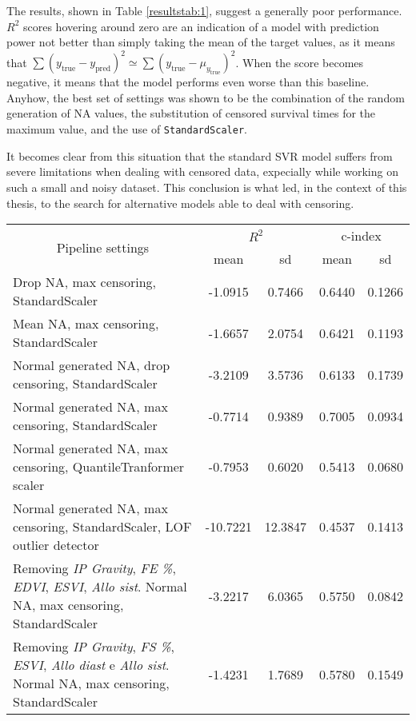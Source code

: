\documentclass[12pt]{report}
\begin{document}
The results, shown in Table \ref{resultstab:1}, suggest a generally poor performance. $R^2$ scores hovering around zero are an indication of a model with prediction power not better than simply taking the mean of the target values, as it means that $\sum(y_{\text{true}} - y_{\text{pred}})^2 \simeq \sum(y_{\text{true}} - \mu_{y_{\text{true}}})^2$. When the score becomes negative, it means that the model performs even worse than this baseline. Anyhow, the best set of settings was shown to be the combination of the random generation of NA values, the substitution of censored survival times for the maximum value, and the use of \texttt{StandardScaler}.

It becomes clear from this situation that the standard SVR model suffers from severe limitations when dealing with censored data, expecially while working on such a small and noisy dataset. This conclusion is what led, in the context of this thesis, to the search for alternative models able to deal with censoring.

\begin{center}
 \begin{tabular}{ |m{7cm}|c|c|c|c| }
\hline
\multicolumn{1}{|c|}{\multirow{2}{*}{Pipeline settings}} & \multicolumn{2}{|c|}{$R^2$} & \multicolumn{2}{|c|}{c-index} \\ \cline{2-5}
& mean & sd & mean & sd \\ \hline
Drop NA, max censoring, StandardScaler & -1.0915 & 0.7466 & 0.6440 & 0.1266 \\ \hline
Mean NA, max censoring, StandardScaler & -1.6657 & 2.0754 & 0.6421 & 0.1193 \\ \hline
Normal generated NA, drop censoring, StandardScaler & -3.2109 & 3.5736 & 0.6133 & 0.1739 \\ \hline
Normal generated NA, max censoring, StandardScaler & -0.7714 & 0.9389 & 0.7005 & 0.0934 \\ \hline
Normal generated NA, max censoring, QuantileTranformer scaler & -0.7953 & 0.6020 & 0.5413 & 0.0680 \\ \hline
Normal generated NA, max censoring, StandardScaler, LOF outlier detector & -10.7221 & 12.3847 & 0.4537 & 0.1413 \\ \hline
Removing \textit{IP Gravity}, \textit{FE \%}, \textit{EDVI}, \textit{ESVI}, \textit{Allo sist}. Normal NA, max censoring, StandardScaler & -3.2217 & 6.0365 & 0.5750 & 0.0842 \\ \hline
Removing \textit{IP Gravity}, \textit{FS \%}, \textit{ESVI}, \textit{Allo diast} e \textit{Allo sist}. Normal NA, max censoring, StandardScaler & -1.4231 & 1.7689 & 0.5780 & 0.1549 \\ \hline
\end{tabular}
\label{resultstab:1}
\end{center} 
\end{document}
